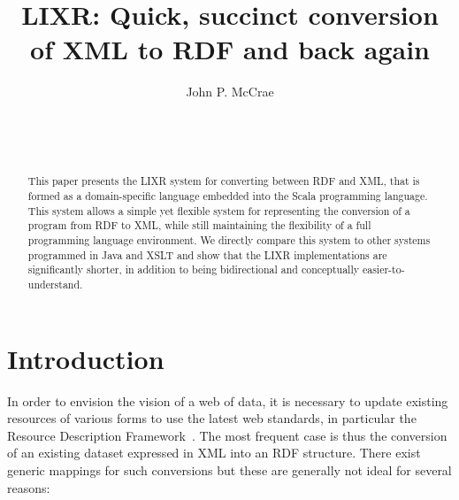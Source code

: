 \documentclass{acm_proc_article-sp}
\begin{document}
\title{LIXR: Quick, succinct conversion of XML to RDF and back again}


\author{
\alignauthor
John P. McCrae\\
       \\
       \\
       \\
}

\maketitle
\begin{abstract}
This paper presents the LIXR system for converting between RDF and XML, that is
formed as a domain-specific language embedded into the Scala programming language.
This system allows a simple yet flexible system for representing the conversion
of a program from RDF to XML, while still maintaining the flexibility of a full
programming language environment. We directly compare this system to other systems
programmed in Java and XSLT and show that the LIXR implementations are significantly
shorter, in addition to being bidirectional and conceptually easier-to-understand.

\end{abstract}




\section{Introduction}

In order to envision the vision of a web of data, it is necessary to update existing 
resources of various forms to use the latest web standards, in particular the 
Resource Description Framework~\cite[RDF]{cyganiak2014rdf}. The most frequent case is thus the
conversion of an existing dataset expressed in XML into an RDF structure. There
exist generic mappings for such conversions but these are generally not ideal for
several reasons:
\end{document}
